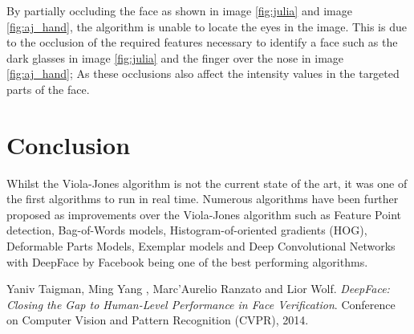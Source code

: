 \documentclass[a4paper,12pt]{article}
\begin{document}
By partially occluding the face as shown in image \ref{fig:julia} and image \ref{fig:aj_hand}, the algorithm is unable to locate the eyes in the image. This is due to the occlusion of the required features necessary to identify a face such as the dark glasses in image \ref{fig:julia} and the finger over the nose in image \ref{fig:aj_hand}; As these occlusions also affect the intensity values in the targeted parts of the face.



\section{Conclusion}
Whilst the Viola-Jones algorithm is not the current state of the art, it was one of the first algorithms to run in real time. Numerous algorithms have been further proposed as improvements over the Viola-Jones algorithm such as Feature Point detection, Bag-of-Words models, Histogram-of-oriented gradients (HOG), Deformable Parts Models, Exemplar models and Deep Convolutional Networks with DeepFace by Facebook \cite{latexcompanion} being one of the best performing algorithms.

\begin{thebibliography}{9}
	Yaniv Taigman, Ming Yang , Marc'Aurelio Ranzato and Lior Wolf.
	\textit{DeepFace: Closing the Gap to Human-Level Performance in Face Verification}. 
	Conference on Computer Vision and Pattern Recognition (CVPR), 2014.
	
\end{thebibliography}
\end{document}
